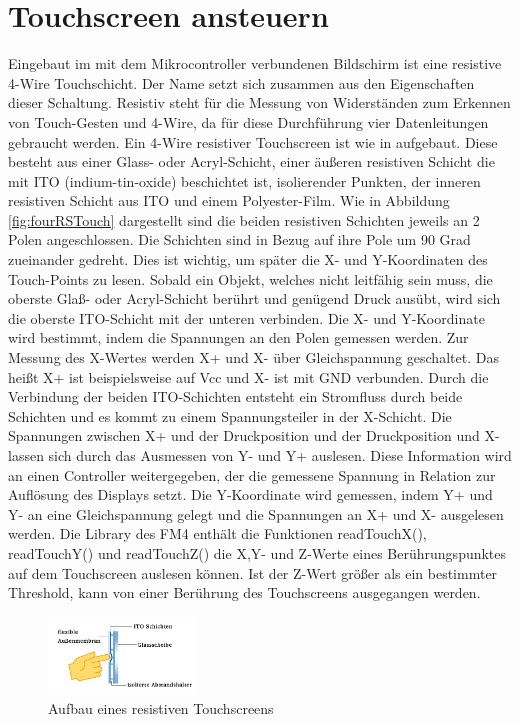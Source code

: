 \section{\ExercisePrefixEmbeddedC Touchscreen ansteuern \optional}
Eingebaut im mit dem Mikrocontroller verbundenen Bildschirm ist eine resistive 4-Wire Touchschicht.
Der Name setzt sich zusammen aus den Eigenschaften dieser Schaltung.
Resistiv steht für die Messung von Widerständen zum Erkennen von Touch-Gesten und 4-Wire, da für diese Durchführung vier Datenleitungen gebraucht werden.
Ein 4-Wire resistiver Touchscreen ist wie in  aufgebaut.
Diese besteht aus einer Glass- oder Acryl-Schicht, einer äußeren resistiven Schicht die mit ITO (indium-tin-oxide) beschichtet ist, isolierender Punkten, der inneren resistiven Schicht aus ITO und einem Polyester-Film. Wie in Abbildung \ref{fig:fourRSTouch} dargestellt sind die beiden resistiven Schichten jeweils an 2 Polen angeschlossen. Die Schichten sind in Bezug auf ihre Pole um 90 Grad zueinander gedreht. Dies ist wichtig, um später die X- und Y-Koordinaten des Touch-Points zu lesen. Sobald ein Objekt, welches nicht leitfähig sein muss, die oberste Glaß- oder Acryl-Schicht berührt und genügend Druck ausübt, wird sich die oberste ITO-Schicht mit der unteren verbinden. Die X- und Y-Koordinate wird bestimmt, indem die Spannungen an den Polen gemessen werden. Zur Messung des X-Wertes werden X+ und X- über Gleichspannung geschaltet. Das heißt X+ ist beispielsweise auf Vcc und X- ist mit GND verbunden. Durch die Verbindung der beiden ITO-Schichten entsteht ein Stromfluss durch beide Schichten und es kommt zu einem Spannungsteiler in der X-Schicht. Die Spannungen zwischen X+ und der Druckposition und der Druckposition und X- lassen sich durch das Ausmessen von Y- und Y+ auslesen. Diese Information wird an einen Controller weitergegeben, der die gemessene Spannung in Relation zur Aufl{\"o}sung des Displays setzt. Die Y-Koordinate wird gemessen, indem Y+ und Y- an eine Gleichspannung gelegt und die Spannungen an X+ und X- ausgelesen werden. Die Library des FM4 enthält die Funktionen readTouchX(), readTouchY() und readTouchZ() die X,Y- und Z-Werte eines Berührungspunktes auf dem Touchscreen auslesen können. Ist der Z-Wert größer als ein bestimmter Threshold, kann von einer Berührung des Touchscreens ausgegangen werden. 
\begin{figure}[htbp]
    \centering
    \includegraphics[width=0.35\textwidth]{./05_c/figures/4WireRSTouch.png}
    \caption{Aufbau eines resistiven Touchscreens}
    \label{fig:rsTouch}
\end{figure}
